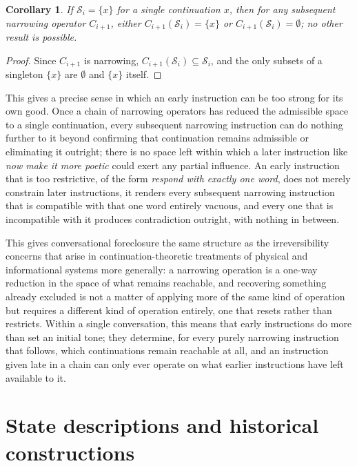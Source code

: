 \documentclass[11pt]{article}
\newtheorem{corollary}{Corollary}
\begin{document}
\begin{corollary}
If $\mathcal{S}_i = \{x\}$ for a single continuation $x$, then for any subsequent narrowing operator $C_{i+1}$, either $C_{i+1}(\mathcal{S}_i) = \{x\}$ or $C_{i+1}(\mathcal{S}_i) = \emptyset$; no other result is possible.
\end{corollary}

\begin{proof}
Since $C_{i+1}$ is narrowing, $C_{i+1}(\mathcal{S}_i) \subseteq \mathcal{S}_i$, and the only subsets of a singleton $\{x\}$ are $\emptyset$ and $\{x\}$ itself.
\end{proof}

This gives a precise sense in which an early instruction can be too strong for its own good. Once a chain of narrowing operators has reduced the admissible space to a single continuation, every subsequent narrowing instruction can do nothing further to it beyond confirming that continuation remains admissible or eliminating it outright; there is no space left within which a later instruction like \emph{now make it more poetic} could exert any partial influence. An early instruction that is too restrictive, of the form \emph{respond with exactly one word}, does not merely constrain later instructions, it renders every subsequent narrowing instruction that is compatible with that one word entirely vacuous, and every one that is incompatible with it produces contradiction outright, with nothing in between.

This gives conversational foreclosure the same structure as the irreversibility concerns that arise in continuation-theoretic treatments of physical and informational systems more generally: a narrowing operation is a one-way reduction in the space of what remains reachable, and recovering something already excluded is not a matter of applying more of the same kind of operation but requires a different kind of operation entirely, one that resets rather than restricts. Within a single conversation, this means that early instructions do more than set an initial tone; they determine, for every purely narrowing instruction that follows, which continuations remain reachable at all, and an instruction given late in a chain can only ever operate on what earlier instructions have left available to it.

\section{State descriptions and historical constructions}
\end{document}
